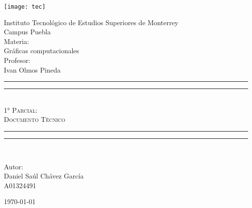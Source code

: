 \begin{titlepage}
\thispagestyle{empty}
\centering
\texttt{[image: tec]}
\vspace*{\baselineskip}


Instituto Tecnológico de Estudios Superiores de Monterrey\\%
Campus Puebla\\[\baselineskip]

 Materia:\\%
 Gráficas computacionales\\[\baselineskip]

Profesor:\\%
Ivan Olmos Pineda\\[\baselineskip]

\rule{\textwidth}{1.6pt}\vspace*{-\baselineskip}\vspace*{2pt}
\rule{\textwidth}{0.4pt}\\[0.7\baselineskip]

\textsc{{\LARGE 1° Parcial:\\[0.7\baselineskip]
\Large{Documento Técnico}}}\\[\baselineskip]

\rule{\textwidth}{0.4pt}\vspace*{-\baselineskip}\vspace{3.2pt}
\rule{\textwidth}{1.6pt}\\[\baselineskip]


\vspace*{4\baselineskip}

Autor: \\[\baselineskip]

Daniel Saúl Chávez García\\
A01324491




\vfill


\scshape{\today{}} \\[0.3\baselineskip]

\clearpage{}

\end{titlepage}
